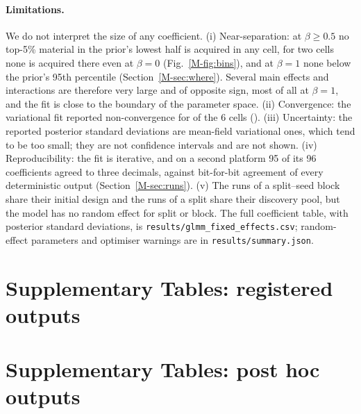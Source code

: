 \documentclass[11pt,a4paper]{article}
\begin{document}
\paragraph{Limitations.} We do not interpret the size of any coefficient. (i) Near-separation: at $\beta\ge0.5$ no top-5\% material in the prior's lowest half
is acquired in any cell, for two cells none is acquired there even at $\beta=0$ (Fig.~\ref{M-fig:bins}), and at $\beta=1$ none below
the prior's 95th percentile (Section~\ref{M-sec:where}). Several main effects and interactions are therefore very large and of
opposite sign, most of all at $\beta=1$, and the fit is close to the boundary of the parameter space. (ii)
Convergence: the variational fit reported non-convergence for  of the 6 cells
(). (iii) Uncertainty: the reported posterior standard deviations are mean-field
variational ones, which tend to be too small; they are not confidence intervals and are not shown. (iv) Reproducibility: the fit
is iterative, and on a second platform 95 of its 96 coefficients agreed to three decimals, against bit-for-bit agreement of every
deterministic output (Section~\ref{M-sec:runs}). (v) The runs of a split--seed block share their initial design and the
runs of a split share their discovery pool, but the model has no random effect for split or block. The full coefficient table, with posterior standard deviations,
is \texttt{results/glmm\_fixed\_effects.csv}; random-effect parameters and optimiser warnings are in
\texttt{results/summary.json}.

\clearpage
\section*{Supplementary Tables: registered outputs}


\clearpage
\section*{Supplementary Tables: post hoc outputs}

\end{document}
